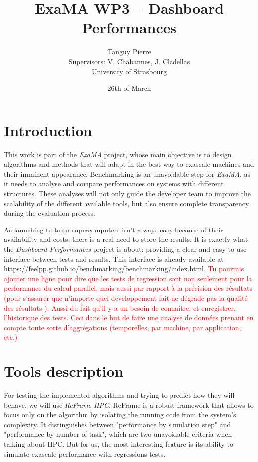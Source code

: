 \documentclass[12pt]{article}
\title{\textbf{ExaMA WP3 -- Dashboard Performances}}
\author{Tanguy Pierre\\[0.5cm]
            Supervisors: V. Chabannes, J. Cladellas\\[1cm]
            University of Strasbourg}
\date{26th of March}
\begin{document}
    \maketitle

\newpage
\tableofcontents


\newpage
\section{Introduction}

This work is part of the \textit{ExaMA} project, whose main objective is to design algorithms and methods
that will adapt in the best way to exascale machines and their imminent appearance.\newline
Benchmarking is an unavoidable step for \textit{ExaMA}, as it needs to analyse and compare performances on systems
with different structures. These analyses will not only guide the developer team to improve the scalability of the different available tools,
but also ensure complete transparency during the evaluation process.

As launching tests on supercomputers isn't always easy because of their availability and costs, there is a real need to store the results.
It is exactly what the \textit{Dashboard Performances} project is about: providing a clear and easy to use interface between tests and results.
This interface is already available at \url{https://feelpp.github.io/benchmarking/benchmarking/index.html}.
\textcolor{red}{
    Tu pourrais ajouter une ligne pour dire que les tests de regression
    sont non seulement pour la performance du calcul parallel,
    mais aussi par rapport à la précision des résultats
    (pour s'assurer que n'importe quel developpement fait ne dégrade
    pas la qualité des résultats ).
    Aussi du fait qu'il y a un besoin de connaître, et enregistrer, l'historique des tests.
    Ceci dans le but de faire une analyse de données prenant en compte toute sorte d'aggrégations 
    (temporelles, par machine, par application, etc.)
}

\section{Tools description}

For testing the implemented algorithms and trying to predict how they will behave, we will use \textit{ReFrame HPC}\cite*{ReFrame}.
ReFrame is a robust framework that allows to focus only on the algorithm by isolating the running code from the system's complexity.
It distinguishes between "performance by simulation step" and "performance by number of task", which are two unavoidable criteria when talking about HPC.
But for us, the most interesting feature is its ability to simulate exascale performance with regressions tests.
\end{document}
